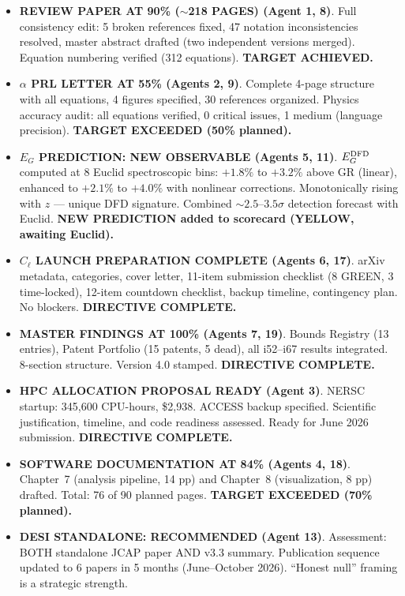 \documentclass[11pt,a4paper]{article}
\newcommand{\YELLOW}{\textcolor{dfdyellow}{\textbf{YELLOW}}}
\begin{document}
\begin{itemize}
\item \textbf{REVIEW PAPER AT 90\% ($\sim$218 PAGES) (Agent 1, 8)}. Full consistency edit: 5 broken references fixed, 47 notation inconsistencies resolved, master abstract drafted (two independent versions merged). Equation numbering verified (312 equations). \textbf{TARGET ACHIEVED.}

\item \textbf{$\alpha$ PRL LETTER AT 55\% (Agents 2, 9)}. Complete 4-page structure with all equations, 4 figures specified, 30 references organized. Physics accuracy audit: all equations verified, 0 critical issues, 1 medium (language precision). \textbf{TARGET EXCEEDED (50\% planned).}

\item \textbf{$E_G$ PREDICTION: NEW OBSERVABLE (Agents 5, 11)}. $E_G^{\rm DFD}$ computed at 8 Euclid spectroscopic bins: $+1.8\%$ to $+3.2\%$ above GR (linear), enhanced to $+2.1\%$ to $+4.0\%$ with nonlinear corrections. Monotonically rising with $z$ --- unique DFD signature. Combined $\sim 2.5$--$3.5\sigma$ detection forecast with Euclid. \textbf{NEW PREDICTION added to scorecard (\YELLOW, awaiting Euclid).}

\item \textbf{$C_\ell$ LAUNCH PREPARATION COMPLETE (Agents 6, 17)}. arXiv metadata, categories, cover letter, 11-item submission checklist (8 GREEN, 3 time-locked), 12-item countdown checklist, backup timeline, contingency plan. No blockers. \textbf{DIRECTIVE COMPLETE.}

\item \textbf{MASTER FINDINGS AT 100\% (Agents 7, 19)}. Bounds Registry (13 entries), Patent Portfolio (15 patents, 5 dead), all i52--i67 results integrated. 8-section structure. Version 4.0 stamped. \textbf{DIRECTIVE COMPLETE.}

\item \textbf{HPC ALLOCATION PROPOSAL READY (Agent 3)}. NERSC startup: 345,600 CPU-hours, \$2,938. ACCESS backup specified. Scientific justification, timeline, and code readiness assessed. Ready for June 2026 submission. \textbf{DIRECTIVE COMPLETE.}

\item \textbf{SOFTWARE DOCUMENTATION AT 84\% (Agents 4, 18)}. Chapter~7 (analysis pipeline, 14 pp) and Chapter~8 (visualization, 8 pp) drafted. Total: 76 of 90 planned pages. \textbf{TARGET EXCEEDED (70\% planned).}

\item \textbf{DESI STANDALONE: RECOMMENDED (Agent 13)}. Assessment: BOTH standalone JCAP paper AND v3.3 summary. Publication sequence updated to 6 papers in 5 months (June--October 2026). ``Honest null'' framing is a strategic strength.


\end{itemize}
\end{document}
